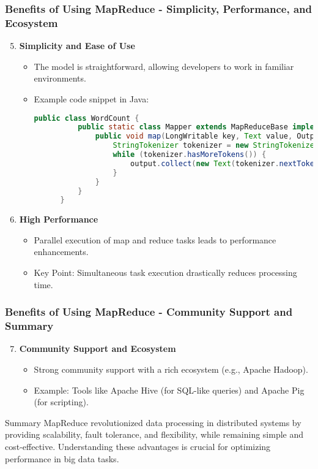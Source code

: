\documentclass[aspectratio=169]{beamer}
\begin{document}
\begin{frame}[fragile]
  \frametitle{Benefits of Using MapReduce - Simplicity, Performance, and Ecosystem}
  \begin{enumerate}
    \setcounter{enumi}{4} %
    \item \textbf{Simplicity and Ease of Use}
    \begin{itemize}
      \item The model is straightforward, allowing developers to work in familiar environments.
      \item Example code snippet in Java:
      \begin{lstlisting}[language=Java]
      public class WordCount {
          public static class Mapper extends MapReduceBase implements Mapper<LongWritable, Text, Text, IntWritable> {
              public void map(LongWritable key, Text value, OutputCollector<Text, IntWritable> output, Reporter reporter) {
                  StringTokenizer tokenizer = new StringTokenizer(value.toString());
                  while (tokenizer.hasMoreTokens()) {
                      output.collect(new Text(tokenizer.nextToken()), new IntWritable(1));
                  }
              }
          }
      }
      \end{lstlisting}
    \end{itemize}

    \item \textbf{High Performance}
    \begin{itemize}
      \item Parallel execution of map and reduce tasks leads to performance enhancements.
      \item Key Point: Simultaneous task execution drastically reduces processing time.
    \end{itemize}
  \end{enumerate}
\end{frame}

\begin{frame}[fragile]
  \frametitle{Benefits of Using MapReduce - Community Support and Summary}
  \begin{enumerate}
    \setcounter{enumi}{6} %
    \item \textbf{Community Support and Ecosystem}
    \begin{itemize}
      \item Strong community support with a rich ecosystem (e.g., Apache Hadoop).
      \item Example: Tools like Apache Hive (for SQL-like queries) and Apache Pig (for scripting).
    \end{itemize}
  \end{enumerate}

  \begin{block}{Summary}
    MapReduce revolutionized data processing in distributed systems by providing scalability, fault tolerance, and flexibility, while remaining simple and cost-effective.
    Understanding these advantages is crucial for optimizing performance in big data tasks.
  \end{block}
\end{frame}
\end{document}
